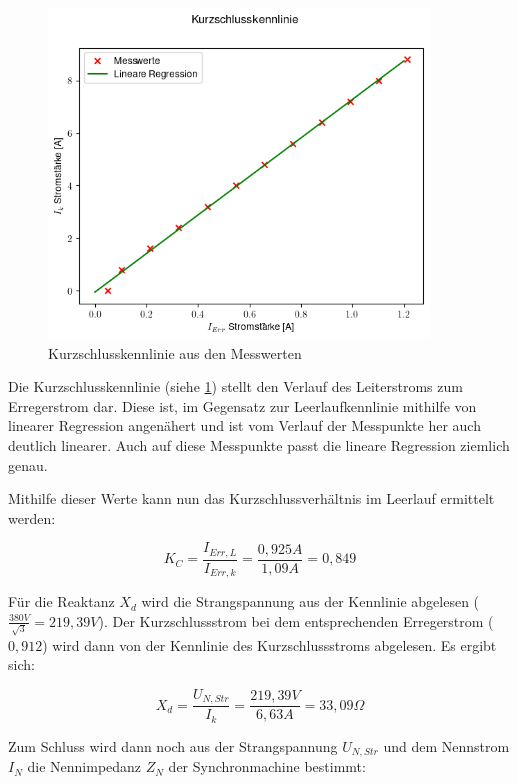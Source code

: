 \documentclass{report}
\begin{document}
\begin{figure}[!ht]
	\centering
	\includegraphics[width=0.9\textwidth]{./assets/img/kurzschluss_kennlinie.png}
	\caption{Kurzschlusskennlinie aus den Messwerten}
	\label{fig:kurzschlusskennlinie}
\end{figure}

Die Kurzschlusskennlinie (siehe \ref{fig:kurzschlusskennlinie}) stellt den Verlauf des Leiterstroms zum Erregerstrom dar. Diese ist, im Gegensatz zur Leerlaufkennlinie mithilfe von linearer Regression angenähert und ist vom Verlauf der Messpunkte her auch deutlich linearer. Auch auf diese Messpunkte passt die lineare Regression ziemlich genau.

Mithilfe dieser Werte kann nun das Kurzschlussverhältnis im Leerlauf ermittelt werden:

\begin{equation}
	\label{eq:1}
	K_{C} = \frac{I_{Err, L}}{I_{Err,k}} = \frac{0,925A}{1,09A} = 0,849
\end{equation}

Für die Reaktanz $X_{d}$ wird die Strangspannung aus der Kennlinie abgelesen ($\frac{380V}{\sqrt{3}} = 219,39V$). Der Kurzschlussstrom bei dem entsprechenden Erregerstrom ($0,912$) wird dann von der Kennlinie des Kurzschlussstroms abgelesen. Es ergibt sich:

\begin{equation}
	\label{eq:2}
	X_{d} = \frac{U_{N,Str}}{I_{k}} = \frac{219,39V}{6,63A} = 33,09\Omega
\end{equation}

Zum Schluss wird dann noch aus der Strangspannung $U_{N,Str}$ und dem Nennstrom $I_{N}$ die Nennimpedanz $Z_{N}$ der Synchronmachine bestimmt:
\end{document}
